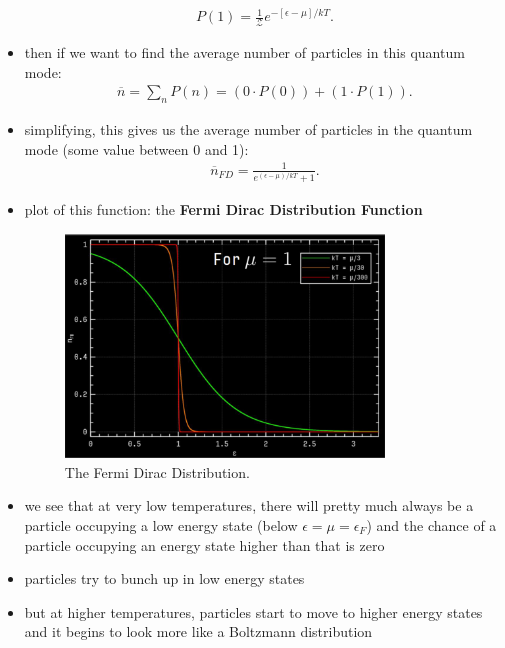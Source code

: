 \documentclass[10pt]{article}
\begin{document}
\begin{itemize}
\begin{gather*}
            P(1) = \frac{1}{\mathcal{Z}}e^{-[\epsilon-\mu] / kT}
        .\end{gather*}
    \item then if we want to find the average number of particles in this quantum mode: 
        \begin{gather*}
            \overline{n} = \sum_{n} P(n) = (0 \cdot P(0)) + (1 \cdot P(1))
        .\end{gather*}
    \item simplifying, this gives us the average number of particles in the quantum mode (some value between 0 and 1):
        \begin{gather*}
            \overline{n}_{FD} = \frac{1}{e^{(\epsilon-\mu) / kT} + 1}
        .\end{gather*}
    \item plot of this function: the \textbf{Fermi Dirac Distribution Function} 
        \begin{figure}[H]
            \centering
            \includegraphics[width=0.8\textwidth]{fermiDirac}
            \caption{The Fermi Dirac Distribution.}
            \label{fig:fermiDirac}
        \end{figure}
    \item we see that at very low temperatures, there will pretty much always be a particle occupying a low energy state (below $\epsilon = \mu = \epsilon_F$) and the chance of a particle occupying an energy state higher than that is zero
    \item particles try to bunch up in low energy states
    \item but at higher temperatures, particles start to move to higher energy states and it begins to look more like a Boltzmann distribution
\end{itemize}
\end{document}
